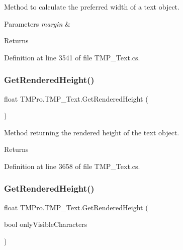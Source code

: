 Method to calculate the preferred width of a text object. 


\begin{DoxyParams}{Parameters}
{\em margin} & \\
\hline
\end{DoxyParams}
\begin{DoxyReturn}{Returns}

\end{DoxyReturn}


Definition at line 3541 of file T\+M\+P\+\_\+\+Text.\+cs.

\mbox{\label{class_t_m_pro_1_1_t_m_p___text_a935fe16317c1b8250ca6b748dba7bd19}} 
\subsubsection{\texorpdfstring{GetRenderedHeight()}{GetRenderedHeight()}\hspace{0.1cm}{\footnotesize\ttfamily [1/2]}}
{\footnotesize\ttfamily float T\+M\+Pro.\+T\+M\+P\+\_\+\+Text.\+Get\+Rendered\+Height (\begin{DoxyParamCaption}{ }\end{DoxyParamCaption})\hspace{0.3cm}{\ttfamily [protected]}}



Method returning the rendered height of the text object. 

\begin{DoxyReturn}{Returns}

\end{DoxyReturn}


Definition at line 3658 of file T\+M\+P\+\_\+\+Text.\+cs.

\mbox{\label{class_t_m_pro_1_1_t_m_p___text_ac94f45240acb3ae89c3c2a70437030ce}} 
\subsubsection{\texorpdfstring{GetRenderedHeight()}{GetRenderedHeight()}\hspace{0.1cm}{\footnotesize\ttfamily [2/2]}}
{\footnotesize\ttfamily float T\+M\+Pro.\+T\+M\+P\+\_\+\+Text.\+Get\+Rendered\+Height (\begin{DoxyParamCaption}\item[{bool}]{only\+Visible\+Characters }\end{DoxyParamCaption})\hspace{0.3cm}{\ttfamily [protected]}}



